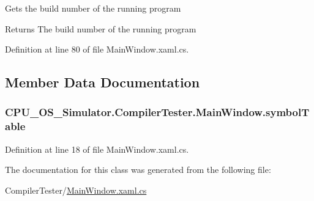 Gets the build number of the running program 

\begin{DoxyReturn}{Returns}
The build number of the running program
\end{DoxyReturn}


Definition at line 80 of file Main\+Window.\+xaml.\+cs.



\subsection{Member Data Documentation}
\hypertarget{class_c_p_u___o_s___simulator_1_1_compiler_tester_1_1_main_window_a12ef52cc8436a259d0bb1c29858b100e}{}
\subsubsection[{symbol\+Table}]{ C\+P\+U\+\_\+\+O\+S\+\_\+\+Simulator.\+Compiler\+Tester.\+Main\+Window.\+symbol\+Table\hspace{0.3cm}{\ttfamily [private]}}\label{class_c_p_u___o_s___simulator_1_1_compiler_tester_1_1_main_window_a12ef52cc8436a259d0bb1c29858b100e}


Definition at line 18 of file Main\+Window.\+xaml.\+cs.



The documentation for this class was generated from the following file\+:\begin{DoxyCompactItemize}
\item 
Compiler\+Tester/\hyperlink{_compiler_tester_2_main_window_8xaml_8cs}{Main\+Window.\+xaml.\+cs}\end{DoxyCompactItemize}
